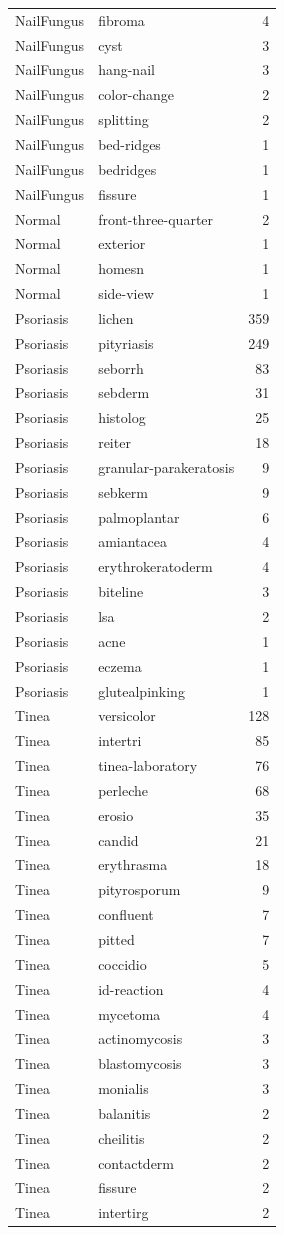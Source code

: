 \begin{tabular}{llr}
NailFungus & fibroma & 4 \\
NailFungus & cyst & 3 \\
NailFungus & hang-nail & 3 \\
NailFungus & color-change & 2 \\
NailFungus & splitting & 2 \\
NailFungus & bed-ridges & 1 \\
NailFungus & bedridges & 1 \\
NailFungus & fissure & 1 \\
Normal & front-three-quarter & 2 \\
Normal & exterior & 1 \\
Normal & homesn & 1 \\
Normal & side-view & 1 \\
Psoriasis & lichen & 359 \\
Psoriasis & pityriasis & 249 \\
Psoriasis & seborrh & 83 \\
Psoriasis & sebderm & 31 \\
Psoriasis & histolog & 25 \\
Psoriasis & reiter & 18 \\
Psoriasis & granular-parakeratosis & 9 \\
Psoriasis & sebkerm & 9 \\
Psoriasis & palmoplantar & 6 \\
Psoriasis & amiantacea & 4 \\
Psoriasis & erythrokeratoderm & 4 \\
Psoriasis & biteline & 3 \\
Psoriasis & lsa & 2 \\
Psoriasis & acne & 1 \\
Psoriasis & eczema & 1 \\
Psoriasis & glutealpinking & 1 \\
Tinea & versicolor & 128 \\
Tinea & intertri & 85 \\
Tinea & tinea-laboratory & 76 \\
Tinea & perleche & 68 \\
Tinea & erosio & 35 \\
Tinea & candid & 21 \\
Tinea & erythrasma & 18 \\
Tinea & pityrosporum & 9 \\
Tinea & confluent & 7 \\
Tinea & pitted & 7 \\
Tinea & coccidio & 5 \\
Tinea & id-reaction & 4 \\
Tinea & mycetoma & 4 \\
Tinea & actinomycosis & 3 \\
Tinea & blastomycosis & 3 \\
Tinea & monialis & 3 \\
Tinea & balanitis & 2 \\
Tinea & cheilitis & 2 \\
Tinea & contactderm & 2 \\
Tinea & fissure & 2 \\
Tinea & intertirg & 2 \\
\bottomrule
\end{tabular}
